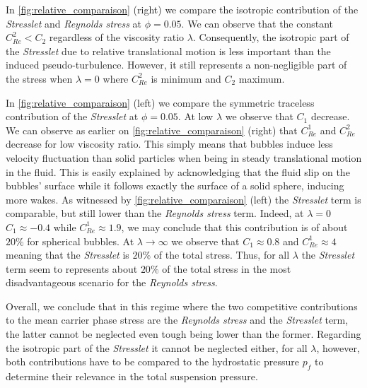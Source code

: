 In \ref{fig:relative_comparaison} (right) we compare the isotropic contribution of the \textit{Stresslet} and \textit{Reynolds stress} at $\phi =0.05$. 
We can observe that the constant $C_{Re}^2 < C_2$ regardless of the viscosity ratio $\lambda$. 
Consequently, the isotropic part of the \textit{Stresslet} due to relative translational motion is less important than the induced pseudo-turbulence.
However, it still represents a non-negligible part of the stress when $\lambda = 0$ where $C_{Re}^2$ is minimum and $C_2$ maximum. 


In \ref{fig:relative_comparaison} (left) we compare the symmetric traceless contribution of the \textit{Stresslet} at $\phi =0.05$. 
At low $\lambda$ we observe that $C_1$ decrease. 
We can observe as earlier on \ref{fig:relative_comparaison} (right) that $C_{Re}^1$ and $C_{Re}^2$ decrease for low viscosity ratio. 
This simply means that bubbles induce less velocity fluctuation than solid particles when being in steady translational motion in the fluid. 
This is easily explained by acknowledging that the fluid slip on the bubbles' surface while it follows exactly the surface of a solid sphere, inducing more wakes. 
As witnessed by \ref{fig:relative_comparaison} (left) the \textit{Stresslet} term is comparable, but still lower than the \textit{Reynolds stress} term.
Indeed, at $\lambda = 0$ $C_1 \approx - 0.4$ while $C^1_{Re} \approx 1.9$, we may conclude that this contribution is of about $20\%$ for spherical bubbles.
At $\lambda \to \infty$ we observe that $C_1 \approx 0.8$ and $C^1_{Re}\approx 4$ meaning that the \textit{Stresslet} is $20\%$ of the total stress.
Thus, for all $\lambda$ the \textit{Stresslet} term seem to  represents about $20\%$ of the total stress in the most disadvantageous scenario for the \textit{Reynolds stress}. 

Overall, we conclude that in this regime where the two competitive contributions to the mean carrier phase stress are the \textit{Reynolds stress} and the \textit{Stresslet} term, the latter cannot be neglected even tough being lower than the former. 
Regarding the isotropic part of the \textit{Stresslet} it cannot be neglected either, for all $\lambda$, however, both contributions have to be compared to the hydrostatic pressure $p_f$ to determine their relevance in the total suspension pressure.
